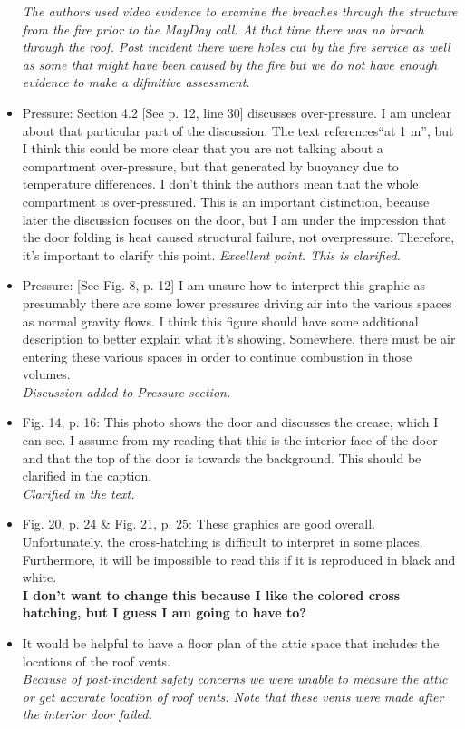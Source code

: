 \documentclass[12pt]{article}
\begin{document}
\begin{itemize}
{\it The authors used video evidence to examine the breaches through the structure from the fire prior to the MayDay call. At that time there was no breach through the roof. Post incident there were holes cut by the fire service as well as some that might have been caused by the fire but we do not have enough evidence to make a difinitive assessment.}
\item Pressure: Section 4.2 [See p. 12, line 30] discusses over-pressure. I am unclear about that particular part of the discussion. The text references``at 1 m'', but I think this could be more clear that you are not talking about a compartment over-pressure, but that generated by buoyancy due to temperature differences. I don't think the authors mean that the whole compartment is over-pressured. This is an important distinction, because later the discussion focuses on the door, but I am under the impression that the door folding is heat caused structural failure, not overpressure. Therefore, it's important to clarify this point.
{\it Excellent point. This is clarified.}
\item Pressure: [See Fig. 8, p. 12] I am unsure how to interpret this graphic as presumably there are some lower pressures driving air into the various spaces as normal gravity flows. I think this figure should have some additional description to better explain what it's showing. Somewhere, there must be air entering these various spaces in order to continue combustion in those volumes. \\
{\it Discussion added to Pressure section.}
\item Fig. 14, p. 16: This photo shows the door and discusses the crease, which I can see. I assume from my reading that this is the interior face of the door and that the top of the door is towards the background. This should be clarified in the caption. \\
{\it Clarified in the text.}
\item Fig. 20, p. 24 \& Fig. 21, p. 25: These graphics are good overall. Unfortunately, the cross-hatching is difficult to interpret in some places. Furthermore, it will be impossible to read this if it is reproduced in black and white. \\
{\bf I don't want to change this because I like the colored cross hatching, but I guess I am going to have to?}
\item  It would be helpful to have a floor plan of the attic space that includes the locations of the roof vents. \\
{\it Because of post-incident safety concerns we were unable to measure the attic or get accurate location of roof vents. Note that these vents were made after the interior door failed.}
\end{itemize}
\end{document}
